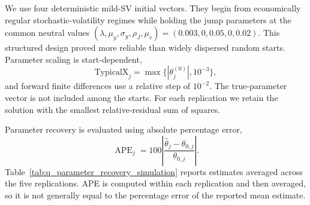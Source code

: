 We use four deterministic mild-SV initial vectors. They begin from
economically regular stochastic-volatility regimes while holding the jump
parameters at the common neutral values
$(\lambda,\mu_y,\sigma_y,\rho_J,\mu_v)
=(0.003,0,0.05,0,0.02)$. This structured design proved more reliable than
widely dispersed random starts. Parameter scaling is start-dependent,
\begin{equation}
\mathrm{TypicalX}_j=\max\{|\theta_j^{(0)}|,10^{-3}\},
\end{equation}
and forward finite differences use a relative step of $10^{-2}$. The
true-parameter vector is not included among the starts. For each replication
we retain the solution with the smallest relative-residual sum of squares.

Parameter recovery is evaluated using absolute percentage error,
\begin{equation}
\operatorname{APE}_j
=100\left|
\frac{\widehat\theta_j-\theta_{0,j}}
     {\theta_{0,j}}
\right|.
\label{eq:q_parameter_ape}
\end{equation}
Table~\ref{tab:q_parameter_recovery_simulation} reports estimates averaged
across the five replications. APE is computed within each replication and
then averaged, so it is not generally equal to the percentage error of the
reported mean estimate.

